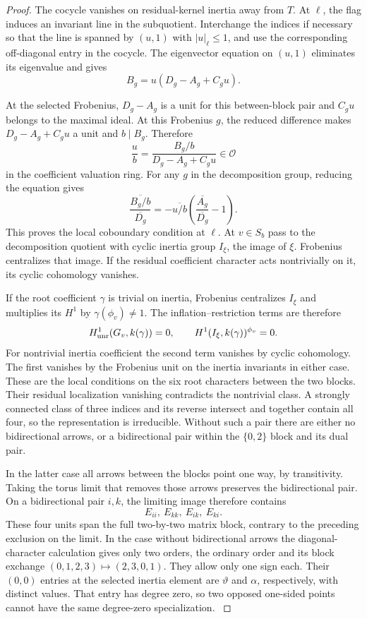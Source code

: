 \begin{proof}
The cocycle vanishes on residual-kernel inertia away from \(T\).
At \(\ell\), the flag induces an invariant line in the
subquotient. Interchange the indices if necessary so that
the line is spanned by \((u,1)\) with \(|u|_\ell\le1\),
and use the corresponding off-diagonal entry in the cocycle.
The eigenvector equation on \((u,1)\) eliminates its
eigenvalue and gives
\[
 B_g=u(D_g-A_g+C_gu).
\]

At the selected Frobenius, \(D_g-A_g\) is a unit for this
between-block pair and \(C_gu\) belongs to the maximal ideal.
At this Frobenius \(g\), the reduced difference makes \(D_g-A_g+C_gu\) a unit and \(b\mid B_g\). Therefore
\[
 \frac{u}{b}=\frac{B_g/b}{D_g-A_g+C_gu}\in\mathcal O
\]
in the coefficient valuation ring.
For any \(g\) in the decomposition group, reducing the equation gives
\[
 \frac{\overline{B_g/b}}{\overline{D_g}}
    =-\overline{u/b}\left(\frac{\overline{A_g}}{\overline{D_g}}-1\right).
\]
This proves the local coboundary condition at \(\ell\).
At \(v\in S_b\) pass to the decomposition quotient with cyclic
inertia group \(I_\xi\), the image of \(\xi\). Frobenius centralizes
that image. If the residual coefficient character acts
nontrivially on it, its cyclic cohomology vanishes.

If the root coefficient \(\gamma\) is trivial on inertia,
Frobenius centralizes \(I_\xi\) and multiplies its \(H^1\) by
\(\gamma(\phi_v)\ne1\). The inflation--restriction terms are
therefore
\[
    H^1_{\rm unr}(G_v,k(\gamma))=0,\qquad
               H^1(I_\xi,k(\gamma))^{\phi_v}=0 .
\]
For nontrivial inertia coefficient the second term vanishes by
cyclic cohomology. The first vanishes by the Frobenius unit
on the inertia invariants in either case. These are the local conditions on the six root characters between the two blocks. Their residual localization vanishing
contradicts the nontrivial class. A strongly connected class of three indices
and its reverse intersect and together contain all four,
so the representation is irreducible. Without such a pair
there are either no bidirectional arrows, or a bidirectional
pair within the \(\{0,2\}\) block and its dual pair.

In the
latter case all arrows between the blocks point one way, by
transitivity. Taking the torus limit that removes those
arrows preserves the bidirectional pair. On a bidirectional pair \(i,k\), the limiting image therefore contains
\[
 E_{ii},\ E_{kk},\ E_{ik},\ E_{ki}.
\]
These four units span the full two-by-two matrix block, contrary to the preceding exclusion on the limit. In the case without bidirectional
arrows the diagonal-character calculation gives only two
orders, the ordinary order and its block exchange
\((0,1,2,3)\mapsto(2,3,0,1)\).
They allow only one sign each. Their \((0,0)\) entries
at the selected inertia element are \(\vartheta\) and
\(\alpha\), respectively, with distinct values. That entry
has degree zero, so two opposed one-sided points cannot
have the same degree-zero specialization.
\label{cor:ordinary-symplectic-cohomology-12}

\end{proof}

